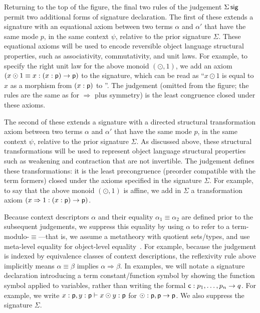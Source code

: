 \documentclass[a4paper,USenglish,numberwithinsect]{lipics-v2016}
\newcommand\deq{\ensuremath{\equiv}}
\newcommand\spr{\ensuremath{\Rightarrow}} %
\begin{document}
Returning to the top of the figure, the final two rules of the judgement
$\Sigma \, \mathsf{sig}$ permit two additional forms of signature declaration.
The first of these extends a signature with an equational axiom between
two terms $\alpha$ and $\alpha'$ that have the same mode $p$, in the
same context $\psi$, relative to the prior signature $\Sigma$.  These
equational axioms will be used to encode reversible object language
structural properties, such as associativity, commutativity, and unit
laws.  For example, to specify the right unit law for the above monoid
$(\odot,1)$, we add an axiom $(x \odot 1 \deq x : (x : \dsd{p}) \to
\dsd{p})$ to the signature, which can be read as ``$x \odot 1$ is equal
to $x$ as a morphism from $(x : \mathsf{p})$ to ''.  The judgement
 (omitted from the figure; the
rules are the same as for $\spr$ plus symmetry) is the least congruence
closed under these axioms.

The second of these extends a signature with a directed structural
transformation axiom between two terms $\alpha$ and $\alpha'$ that have
the same mode $p$, in the same context $\psi$, relative to the prior
signature $\Sigma$.  As discussed above, these structural
transformations will be used to represent object language structural
properties such as weakening and contraction that are not invertible.
The judgement  defines these
transformations: it is the least precongruence (preorder compatible with
the term formers) closed under the axioms specified in the signature
$\Sigma$.  For example, to say that the above monoid $(\odot,1)$ is
affine, we add in $\Sigma$ a transformation axiom $(x \spr 1 : (x:\dsd{p}) \to
{\dsd{p}})$.

Because context descriptors $\alpha$ and their equality $\alpha_1 \deq
\alpha_2$ are defined prior to the subsequent judgements, we suppress
this equality by using $\alpha$ to refer to a term-modulo-\deq---that
is, we assume a metatheory with quotient sets/types, and use meta-level
equality for object-level equality~\cite{altenkirchkaposi16qit}.  For
example, because the judgement  is indexed
by equivalence classes of context descriptions, the reflexivity rule
above implicitly means $\alpha \deq \beta$ implies $\alpha \spr \beta$.
In examples, we will notate a signature declaration introducing a term
constant/function symbol by showing the function symbol applied to
variables, rather than writing the formal $\mathsf{c} : p_1,\ldots,p_n \to
q$. For example, we write $x : \mathsf{p}, y : \mathsf{p} \vdash x \odot y :
\mathsf{p}$ for $\odot : \mathsf{p},\mathsf{p} \to \mathsf{p}$.  We also suppress
the signature $\Sigma$.
\end{document}
